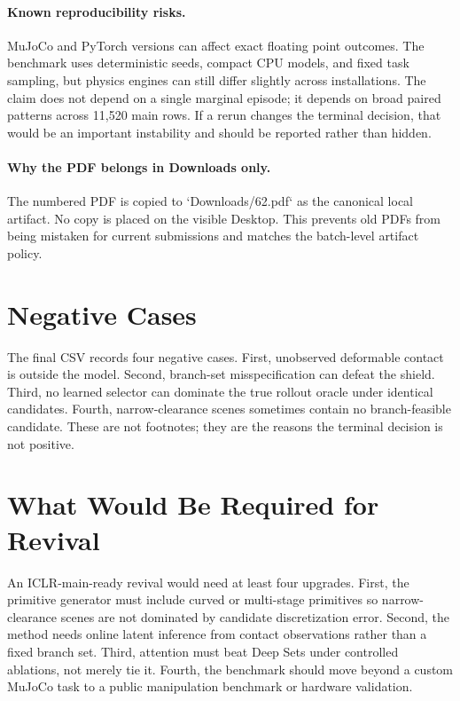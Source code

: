\documentclass{article}
\begin{document}
\paragraph{Known reproducibility risks.}
MuJoCo and PyTorch versions can affect exact floating point outcomes.  The benchmark uses deterministic seeds, compact CPU models, and fixed task sampling, but physics engines can still differ slightly across installations.  The claim does not depend on a single marginal episode; it depends on broad paired patterns across 11,520 main rows.  If a rerun changes the terminal decision, that would be an important instability and should be reported rather than hidden.

\paragraph{Why the PDF belongs in Downloads only.}
The numbered PDF is copied to `Downloads/62.pdf` as the canonical local artifact.  No copy is placed on the visible Desktop.  This prevents old PDFs from being mistaken for current submissions and matches the batch-level artifact policy.

\section{Negative Cases}

The final CSV records four negative cases.  First, unobserved deformable contact is outside the model.  Second, branch-set misspecification can defeat the shield.  Third, no learned selector can dominate the true rollout oracle under identical candidates.  Fourth, narrow-clearance scenes sometimes contain no branch-feasible candidate.  These are not footnotes; they are the reasons the terminal decision is not positive.

\section{What Would Be Required for Revival}

An ICLR-main-ready revival would need at least four upgrades.  First, the primitive generator must include curved or multi-stage primitives so narrow-clearance scenes are not dominated by candidate discretization error.  Second, the method needs online latent inference from contact observations rather than a fixed branch set.  Third, attention must beat Deep Sets under controlled ablations, not merely tie it.  Fourth, the benchmark should move beyond a custom MuJoCo task to a public manipulation benchmark or hardware validation.



\end{document}

